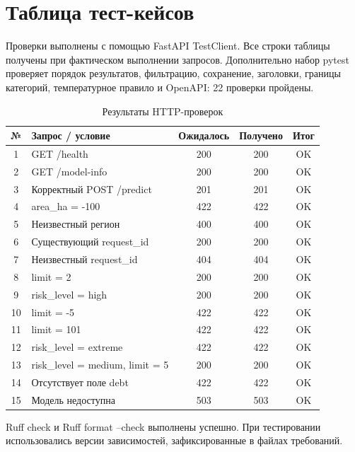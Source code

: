 \documentclass[12pt,a4paper]{article}
\begin{document}
\section{Таблица тест-кейсов}
Проверки выполнены с помощью FastAPI TestClient. Все строки таблицы получены при фактическом выполнении запросов. Дополнительно набор pytest проверяет порядок результатов, фильтрацию, сохранение, заголовки, границы категорий, температурное правило и OpenAPI: 22 проверки пройдены.
\begin{table}[H]
\centering\caption{Результаты HTTP-проверок}
\small
\begin{tabularx}{\textwidth}{|c|X|c|c|c|}\hline
№ & Запрос / условие & Ожидалось & Получено & Итог \\\hline
1 & GET /health & 200 & 200 & OK \\
2 & GET /model-info & 200 & 200 & OK \\
3 & Корректный POST /predict & 201 & 201 & OK \\
4 & area\_ha = -100 & 422 & 422 & OK \\
5 & Неизвестный регион & 400 & 400 & OK \\
6 & Существующий request\_id & 200 & 200 & OK \\
7 & Неизвестный request\_id & 404 & 404 & OK \\
8 & limit = 2 & 200 & 200 & OK \\
9 & risk\_level = high & 200 & 200 & OK \\
10 & limit = -5 & 422 & 422 & OK \\
11 & limit = 101 & 422 & 422 & OK \\
12 & risk\_level = extreme & 422 & 422 & OK \\
13 & risk\_level = medium, limit = 5 & 200 & 200 & OK \\
14 & Отсутствует поле debt & 422 & 422 & OK \\
15 & Модель недоступна & 503 & 503 & OK \\

\hline
\end{tabularx}
\end{table}
Ruff check и Ruff format --check выполнены успешно. При тестировании использовались версии зависимостей, зафиксированные в файлах требований.
\end{document}

